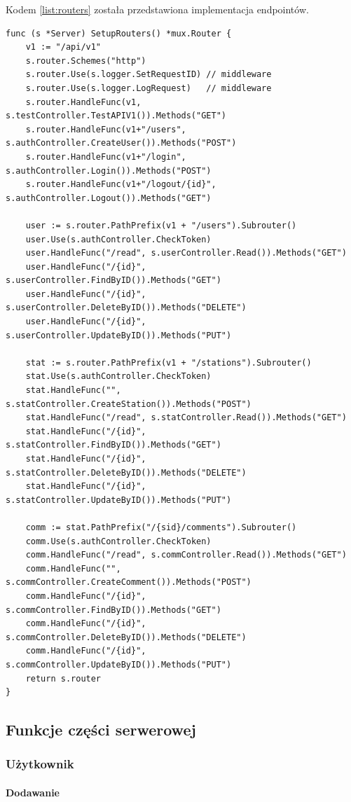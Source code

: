 Kodem \ref{list:routers} została przedstawiona implementacja endpointów.
\begin{lstlisting}[label=list:routers,caption=Implementacja punktów końcowych,basicstyle=\tiny\ttfamily]
func (s *Server) SetupRouters() *mux.Router {
	v1 := "/api/v1"
	s.router.Schemes("http")
	s.router.Use(s.logger.SetRequestID) // middleware
	s.router.Use(s.logger.LogRequest)   // middleware
	s.router.HandleFunc(v1, s.testController.TestAPIV1()).Methods("GET")
	s.router.HandleFunc(v1+"/users", s.authController.CreateUser()).Methods("POST")
	s.router.HandleFunc(v1+"/login", s.authController.Login()).Methods("POST")
	s.router.HandleFunc(v1+"/logout/{id}", s.authController.Logout()).Methods("GET")

	user := s.router.PathPrefix(v1 + "/users").Subrouter()
	user.Use(s.authController.CheckToken)
	user.HandleFunc("/read", s.userController.Read()).Methods("GET")
	user.HandleFunc("/{id}", s.userController.FindByID()).Methods("GET")
	user.HandleFunc("/{id}", s.userController.DeleteByID()).Methods("DELETE")
	user.HandleFunc("/{id}", s.userController.UpdateByID()).Methods("PUT")

	stat := s.router.PathPrefix(v1 + "/stations").Subrouter()
	stat.Use(s.authController.CheckToken)
	stat.HandleFunc("", s.statController.CreateStation()).Methods("POST")
	stat.HandleFunc("/read", s.statController.Read()).Methods("GET")
	stat.HandleFunc("/{id}", s.statController.FindByID()).Methods("GET")
	stat.HandleFunc("/{id}", s.statController.DeleteByID()).Methods("DELETE")
	stat.HandleFunc("/{id}", s.statController.UpdateByID()).Methods("PUT")

	comm := stat.PathPrefix("/{sid}/comments").Subrouter()
	comm.Use(s.authController.CheckToken)
	comm.HandleFunc("/read", s.commController.Read()).Methods("GET")
	comm.HandleFunc("", s.commController.CreateComment()).Methods("POST")
	comm.HandleFunc("/{id}", s.commController.FindByID()).Methods("GET")
	comm.HandleFunc("/{id}", s.commController.DeleteByID()).Methods("DELETE")
	comm.HandleFunc("/{id}", s.commController.UpdateByID()).Methods("PUT")
	return s.router
}
\end{lstlisting}
\subsection{Funkcje części serwerowej}
\subsubsection{Użytkownik}
\paragraph{Dodawanie}
